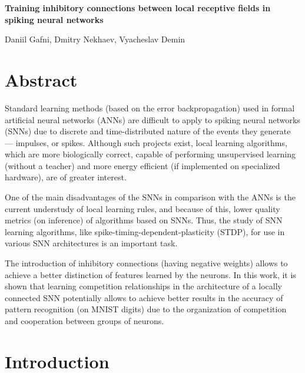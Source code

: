 \documentclass[a4paper]{article}
\begin{document}
\thispagestyle{empty}

\begin{center}
    \large\textbf{Training inhibitory connections between local receptive fields in spiking neural networks}\\
    \hfill\break
    
    Daniil Gafni, Dmitry Nekhaev, Vyacheslav Demin
\end{center}





\section*{Abstract}
Standard learning methods (based on the error backpropagation) used in formal artificial neural networks (ANNs) are difficult to apply to spiking neural networks (SNNs) due to discrete and time-distributed nature of the events they generate --- impulses, or spikes. Although such projects exist, local learning algorithms, which are more biologically correct, capable of performing unsupervised learning (without a teacher) and more energy efficient (if implemented on specialized hardware), are of greater interest.

One of the main disadvantages of the SNNs in comparison with the ANNs is the current understudy of local learning rules, and because of this, lower quality metrics (on inference) of algorithms based on SNNs. Thus, the study of SNN learning algorithms, like spike-timing-dependent-plasticity (STDP), for use in various SNN architectures is an important task.

The introduction of inhibitory connections (having negative weights) allows to achieve a better distinction of features learned by the neurons. In this work, it is shown that learning competition relationships in the architecture of a locally connected SNN potentially allows to achieve better results in the accuracy of pattern recognition (on MNIST digits) due to the organization of competition and cooperation between groups of neurons.

\pagebreak

\section*{Introduction}
\end{document}

